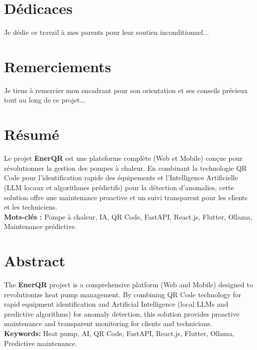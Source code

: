 \documentclass[12pt, a4paper, twoside]{report}
\begin{document}
\chapter*{Dédicaces}
Je dédie ce travail à mes parents pour leur soutien inconditionnel...

\chapter*{Remerciements}
Je tiens à remercier mon encadrant pour son orientation et ses conseils précieux tout au long de ce projet...

\chapter*{Résumé}
Le projet \textbf{EnerQR} est une plateforme complète (Web et Mobile) conçue pour révolutionner la gestion des pompes à chaleur. En combinant la technologie QR Code pour l'identification rapide des équipements et l'Intelligence Artificielle (LLM locaux et algorithmes prédictifs) pour la détection d'anomalies, cette solution offre une maintenance proactive et un suivi transparent pour les clients et les techniciens.\\
\textbf{Mots-clés :} Pompe à chaleur, IA, QR Code, FastAPI, React.js, Flutter, Ollama, Maintenance prédictive.

\chapter*{Abstract}
The \textbf{EnerQR} project is a comprehensive platform (Web and Mobile) designed to revolutionize heat pump management. By combining QR Code technology for rapid equipment identification and Artificial Intelligence (local LLMs and predictive algorithms) for anomaly detection, this solution provides proactive maintenance and transparent monitoring for clients and technicians.\\
\textbf{Keywords:} Heat pump, AI, QR Code, FastAPI, React.js, Flutter, Ollama, Predictive maintenance.

\tableofcontents
\listoffigures
\listoftables
\end{document}
